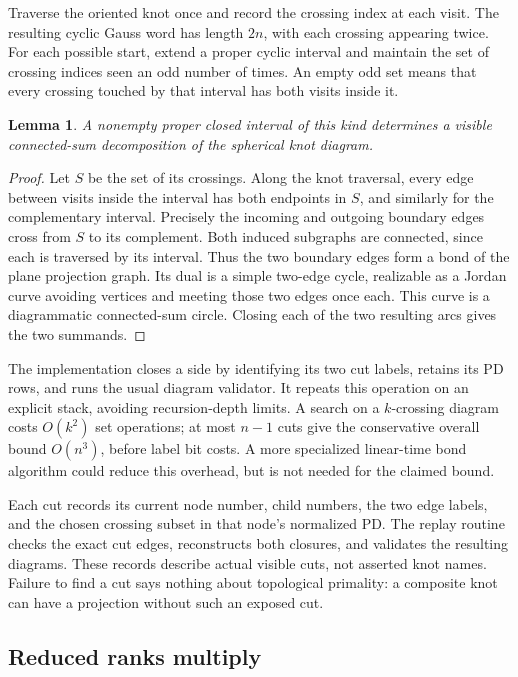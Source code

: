 \documentclass[11pt]{article}
\newtheorem{lemma}[theorem]{Lemma}
\theoremstyle{definition}\newtheorem{definition}[theorem]{Definition}
\theoremstyle{remark}\newtheorem{remark}[theorem]{Remark}
\begin{document}
Traverse the oriented knot once and record the crossing index at each visit.
The resulting cyclic Gauss word has length $2n$, with each crossing appearing
twice. For each possible start, extend a proper cyclic interval and maintain
the set of crossing indices seen an odd number of times. An empty odd set
means that every crossing touched by that interval has both visits inside it.

\begin{lemma}\label{lem:cut}
A nonempty proper closed interval of this kind determines a visible
connected-sum decomposition of the spherical knot diagram.
\end{lemma}
\begin{proof}
Let $S$ be the set of its crossings. Along the knot traversal, every edge
between visits inside the interval has both endpoints in $S$, and similarly
for the complementary interval. Precisely the incoming and outgoing boundary
edges cross from $S$ to its complement. Both induced subgraphs are connected,
since each is traversed by its interval. Thus the two boundary edges form a
bond of the plane projection graph. Its dual is a simple two-edge cycle,
realizable as a Jordan curve avoiding vertices and meeting those two edges
once each. This curve is a diagrammatic connected-sum circle. Closing each
of the two resulting arcs gives the two summands.
\end{proof}

The implementation closes a side by identifying its two cut labels, retains
its PD rows, and runs the usual diagram validator. It repeats this operation
on an explicit stack, avoiding recursion-depth limits. A search on a
$k$-crossing diagram costs $O(k^2)$ set operations; at most $n-1$ cuts give
the conservative overall bound $O(n^3)$, before label bit costs. A more
specialized linear-time bond algorithm could reduce this overhead, but is
not needed for the claimed bound.

Each cut records its current node number, child numbers, the two edge labels,
and the chosen crossing subset in that node's normalized PD. The replay
routine checks the exact cut edges, reconstructs both closures, and validates
the resulting diagrams. These records describe actual visible cuts, not
asserted knot names. Failure to find a cut says nothing about topological
primality: a composite knot can have a projection without such an exposed cut.

\subsection{Reduced ranks multiply}
\end{document}
